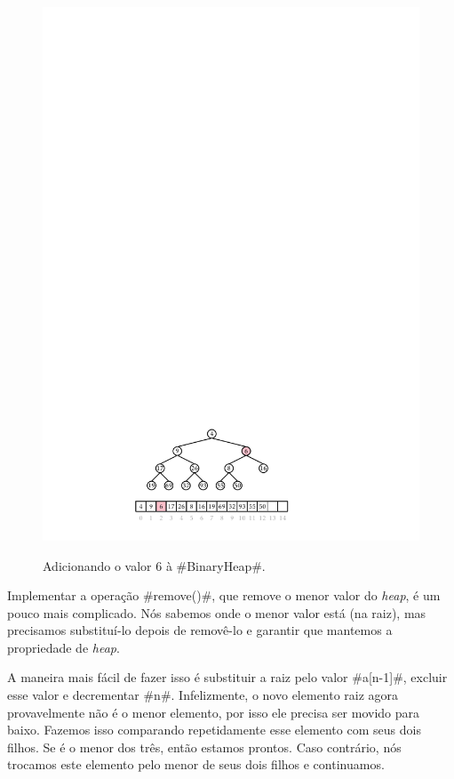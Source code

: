 \begin{figure}
\begin{center}
    \includegraphics[height=\QuarterHeightScaleIfNeeded]{figs/heap-insert-4} \\
  \end{center}
  \caption[Adicionando a um BinaryHeap] {Adicionando o valor 6 à #BinaryHeap#.}
\end{figure}

Implementar a operação #remove()#, que remove o menor valor do \textit{heap}, é um pouco mais complicado. Nós sabemos onde o menor valor está (na raiz), mas precisamos substituí-lo depois de removê-lo e garantir que mantemos a propriedade de \textit{heap}.

A maneira mais fácil de fazer isso é substituir a raiz pelo valor #a[n-1]#, excluir esse valor e decrementar #n#. Infelizmente, o novo elemento raiz agora provavelmente não é o menor elemento, por isso ele precisa ser movido para baixo.
Fazemos isso comparando repetidamente esse elemento com seus dois filhos.
Se é o menor dos três, então estamos prontos. Caso contrário, nós trocamos este elemento pelo menor de seus dois filhos e continuamos.

